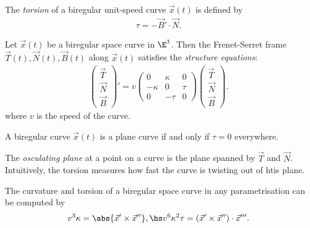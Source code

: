 \documentclass{article}
\begin{document}
\begin{definition}
    The \emph{torsion} of a biregular unit-speed curve $\vec x(t)$ is defined by
    \begin{align*}
        \tau = - \vec B' \cdot \vec N.
    \end{align*}
\end{definition}

\begin{theorem}
    Let $\vec x(t)$ be a biregular space curve in $\E^3$. Then the Frenet-Serret 
    frame $\vec T(t), \vec N(t), \vec B(t)$ along $\vec x(t)$ satisfies the 
    \emph{structure equations}:
    \begin{align*}
        \begin{pmatrix}
            \vec T\\
            \vec N\\
            \vec B
        \end{pmatrix}'
        = v\begin{pmatrix}
            0       & \kappa & 0 \\
            -\kappa & 0      & \tau \\
            0       & -\tau  & 0
        \end{pmatrix}
        \begin{pmatrix}
            \vec T\\
            \vec N\\
            \vec B
        \end{pmatrix}.
    \end{align*}
    where $v$ is the speed of the curve.
\end{theorem}

\begin{theorem}
    A biregular curve $\vec x(t)$ is a plane curve if and only if $\tau=0$ everywhere.
\end{theorem}

\begin{definition}
    The \emph{osculating plane} at a point on a curve is the plane spanned by $\vec T$ and 
    $\vec N$. Intuitively, the torsion measures how fast the curve is twisting out of htis plane.
\end{definition}

\begin{theorem}
    The curvature and torsion of a biregular space curve in any parametrisation can be
    computed by
    \begin{align*}
        v^3\kappa = \abs{\vec x' \times \vec x''},\hs
        v^6\kappa^2\tau = (\vec x' \times \vec x'') \cdot \vec x'''.
    \end{align*}
\end{theorem}
\end{document}
